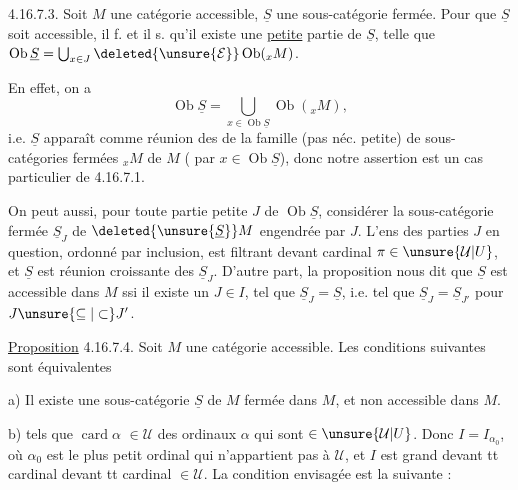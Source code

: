 \uline{} 4.16.7.3. Soit $M$ une catégorie
accessible, $\underline S$ une sous-catégorie fermée.
Pour que $\underline S$ soit accessible, il f. et il
s. qu'il existe une \uline{petite} partie
 de $\underline S$, telle que $\operatorname{Ob}\underline S=\bigcup_{x\in J}\deleted{\unsure{\mathcal E}}\operatorname{Ob}({}_xM)$.

En effet, on a
\[
\operatorname{Ob}\underline S=\bigcup_{x\in\operatorname{Ob}\underline S}\operatorname{Ob}({}_xM),
\]
i.e. $\underline S$ apparaît comme réunion des
de la famille (pas néc. petite) de sous-catégories
fermées $ {}_xM$ de $M$ ( par
$x\in\operatorname{Ob}\underline S$),  donc notre assertion est un
cas particulier de 4.16.7.1.

On peut aussi, pour toute partie petite
$J$ de $\operatorname{Ob}\underline S$, considérer la sous-catégorie
fermée $\underline S_J$ de $\deleted{\unsure{\underline S}}M$ engendrée
par $J$. L'ens  des parties $J$ en
question, ordonné par inclusion, est
filtrant devant  cardinal $\pi\in\unsure{\mathcal U|U}$, et
$\underline S$ est réunion croissante des $\underline S_J$.
D'autre part, la proposition nous dit
que $\underline S$ est accessible dans $M$ ssi
 il existe un $J\in I$, tel que $\underline S_J=\underline S$,
i.e. tel que $\underline S_J=\underline S_{J'}$ pour $J\unsure{\subseteq|\subset}J'$.

\uline{Proposition} 4.16.7.4. Soit $M$ une catégorie
accessible. Les conditions suivantes
sont équivalentes

a) Il existe une sous-catégorie $\underline S$ de $M$
fermée dans $M$, et non accessible dans $M$.

b)  
tels que $\operatorname{card}\alpha$ \deleted{\unsure{$\leq$}} $\in\mathcal U$  des
ordinaux $\alpha$ \deleted{\unsure{$\in$}} qui sont $\in\unsure{\mathcal U|U}$. Donc $I=I_{\alpha_0}$, où
$\alpha_0$ est le plus petit ordinal qui n'appartient
pas à $\mathcal U$, et $I$ est grand devant tt
 cardinal   devant tt cardinal $\in\mathcal U$.
La condition envisagée est la suivante :

